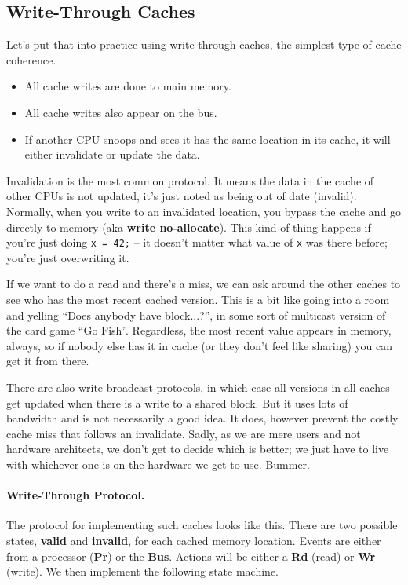 \documentclass[a4paper]{report}
\begin{document}
\subsection*{Write-Through Caches}
Let's put that into practice using write-through caches, the simplest type of
cache coherence.
  \begin{itemize}
    \item All cache writes are done to main memory.
    \item All cache writes also appear on the bus.
    \item If another CPU snoops and sees it has the same location in
      its cache, it will either invalidate or update the
      data.
  \end{itemize}
  
Invalidation is the most common protocol. It means the data in the cache of other CPUs is not updated, it's just noted as being out of date (invalid).  Normally, when you write to an invalidated location, you bypass the cache and go directly to memory (aka {\bf write no-allocate}). This kind of thing happens if you're just doing \texttt{x = 42;} -- it doesn't matter what value of \texttt{x} was there before; you're just overwriting it.

If we want to do a read and there's a miss, we can ask around the other caches to see who has the most recent cached version. This is a bit like going into a room and yelling ``Does anybody have block...?'', in some sort of multicast version of the card game ``Go Fish''. Regardless, the most recent value appears in memory, always, so if nobody else has it in cache (or they don't feel like sharing) you can get it from there.

There are also write broadcast protocols, in which case all versions in all caches get updated when there is a write to a shared block. But it uses lots of bandwidth and is not necessarily a good idea. It does, however prevent the costly cache miss that follows an invalidate. Sadly, as we are mere users and not hardware architects, we don't get to decide which is better; we just have to live with whichever one is on the hardware we get to use. Bummer.

\paragraph{Write-Through Protocol.}
The protocol for implementing such caches looks like this.
There are two possible states, {\bf valid} and {\bf invalid}, for each cached memory location.
Events are either from a processor ({\bf Pr}) or the {\bf Bus}. Actions will be either a \textbf{Rd} (read) or \textbf{Wr} (write).
We then implement the following state machine.
\end{document}
